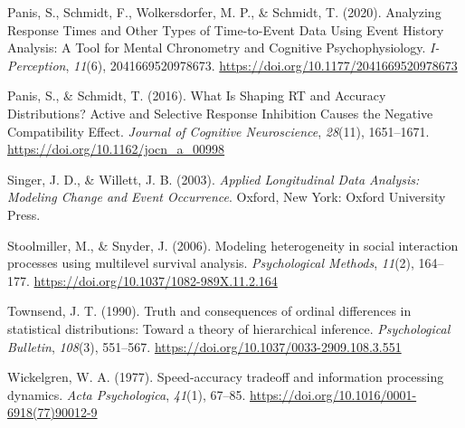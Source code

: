 \documentclass[
  man,floatsintext]{apa6}
\newlength{\cslhangindent}
\newenvironment{CSLReferences}[2] %
 {\begin{list}{}{%
  \setlength{\itemindent}{0pt}
  \setlength{\leftmargin}{0pt}
  \setlength{\parsep}{0pt}
  \ifodd #1
   \setlength{\leftmargin}{\cslhangindent}
   \setlength{\itemindent}{-1\cslhangindent}
  \fi
  \setlength{\itemsep}{#2\baselineskip}}}
 {\end{list}}
\begin{document}
\begin{CSLReferences}{1}{0}
Panis, S., Schmidt, F., Wolkersdorfer, M. P., \& Schmidt, T. (2020). Analyzing {Response Times} and {Other Types} of {Time-to-Event Data Using Event History Analysis}: {A Tool} for {Mental Chronometry} and {Cognitive Psychophysiology}. \emph{I-Perception}, \emph{11}(6), 2041669520978673. \url{https://doi.org/10.1177/2041669520978673}

Panis, S., \& Schmidt, T. (2016). What {Is Shaping RT} and {Accuracy Distributions}? {Active} and {Selective Response Inhibition Causes} the {Negative Compatibility Effect}. \emph{Journal of Cognitive Neuroscience}, \emph{28}(11), 1651--1671. \url{https://doi.org/10.1162/jocn_a_00998}

Singer, J. D., \& Willett, J. B. (2003). \emph{Applied {Longitudinal Data Analysis}: {Modeling Change} and {Event Occurrence}}. Oxford, New York: Oxford University Press.

Stoolmiller, M., \& Snyder, J. (2006). Modeling heterogeneity in social interaction processes using multilevel survival analysis. \emph{Psychological Methods}, \emph{11}(2), 164--177. \url{https://doi.org/10.1037/1082-989X.11.2.164}

Townsend, J. T. (1990). Truth and consequences of ordinal differences in statistical distributions: {Toward} a theory of hierarchical inference. \emph{Psychological Bulletin}, \emph{108}(3), 551--567. \url{https://doi.org/10.1037/0033-2909.108.3.551}

Wickelgren, W. A. (1977). Speed-accuracy tradeoff and information processing dynamics. \emph{Acta Psychologica}, \emph{41}(1), 67--85. \url{https://doi.org/10.1016/0001-6918(77)90012-9}

\end{CSLReferences}
\end{document}

